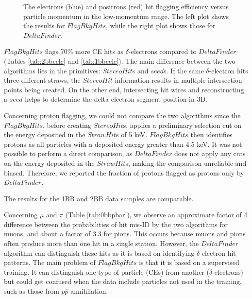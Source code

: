 \begin{figure}[!h]
\begin{subfigure}[t]{0.5\textwidth}
        \caption{}
        \label{fig:eff2}
    \end{subfigure}
    \caption[The electrons (blue) and positrons (red) hit flagging efficiency versus 
    particle momentum in the low-momentum range.]{The electrons 
    (blue) and positrons (red) hit flagging efficiency versus 
    particle momentum in the low-momentum range. The left plot shows the 
    results for $FlagBkgHits$, while the right plot shows those for $DeltaFinder$.
    }
    \label{fig:efficiency}
  \end{figure} 

$FlagBkgHits$ flags 70\% more CE hits 
as $\delta$-electrons compared to $DeltaFinder$ (Tables \ref{tab:2bbcele} 
and \ref{tab:1bbcele}). The main difference between the two algorithms lies in 
the primitives: $StereoHit$s and $seed$s. If the same 
$\delta$-electron hits three different straws, the $StereoHit$ 
information results in multiple intersection points being 
created. On the other end, intersecting hit wires and reconstructing a $seed$ helps 
to determine the delta electron segment position in 3D.

Concerning proton flagging, we could not compare the two 
algorithms since the $FlagBkgHits$, before creating $StereoHit$s, 
applies a preliminary selection cut on the energy deposited in 
the $StrawHit$s of 5 keV. $FlagBkgHits$ then identifies 
protons as all particles with a deposited energy greater than 
4.5 keV. It was not possible to perform a direct comparison, 
as $DeltaFinder$ does not apply any cuts on the energy deposited in 
the $StrawHit$s, making the comparison unreliable and biased. 
Therefore, we reported the fraction of protons flagged as protons only by $DeltaFinder$.

The results for the 1BB and 2BB data samples are comparable.



      
      Concerning $\mu$ and $\pi$ (Table \ref{tab:0bbpbar}), 
      we observe an approximate factor of 
      4 difference between the probabilities of hit mis-ID by the two algorithms 
      for muons, and about a factor of 3.3 for pions. This occurs because 
      muons and pions often produce more than one hit in a single station. However, the 
      $DeltaFinder$ algorithm can distinguish these hits as it 
      is based on identifying $\delta$-electron hit patterns. 
      The main problem of $FlagBkgHits$ is that it is based on a supervised 
      training. It can distinguish one type of particle (CEs) from 
      another ($\delta$-electrons) but could get confused when 
      the data include particles not used in the training, such as 
      those from $p\bar{p}$ annihilation. 
      
